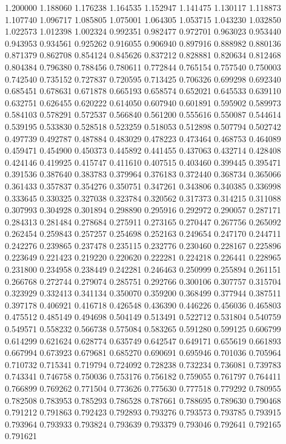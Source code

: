 1.200000
1.188060
1.176238
1.164535
1.152947
1.141475
1.130117
1.118873
1.107740
1.096717
1.085805
1.075001
1.064305
1.053715
1.043230
1.032850
1.022573
1.012398
1.002324
0.992351
0.982477
0.972701
0.963023
0.953440
0.943953
0.934561
0.925262
0.916055
0.906940
0.897916
0.888982
0.880136
0.871379
0.862708
0.854124
0.845626
0.837212
0.828881
0.820634
0.812468
0.804384
0.796380
0.788456
0.780611
0.772844
0.765154
0.757540
0.750003
0.742540
0.735152
0.727837
0.720595
0.713425
0.706326
0.699298
0.692340
0.685451
0.678631
0.671878
0.665193
0.658574
0.652021
0.645533
0.639110
0.632751
0.626455
0.620222
0.614050
0.607940
0.601891
0.595902
0.589973
0.584103
0.578291
0.572537
0.566840
0.561200
0.555616
0.550087
0.544614
0.539195
0.533830
0.528518
0.523259
0.518053
0.512898
0.507794
0.502742
0.497739
0.492787
0.487884
0.483029
0.478223
0.473464
0.468753
0.464089
0.459471
0.454900
0.450373
0.445892
0.441455
0.437063
0.432714
0.428408
0.424146
0.419925
0.415747
0.411610
0.407515
0.403460
0.399445
0.395471
0.391536
0.387640
0.383783
0.379964
0.376183
0.372440
0.368734
0.365066
0.361433
0.357837
0.354276
0.350751
0.347261
0.343806
0.340385
0.336998
0.333645
0.330325
0.327038
0.323784
0.320562
0.317373
0.314215
0.311088
0.307993
0.304928
0.301894
0.298890
0.295916
0.292972
0.290057
0.287171
0.284313
0.281484
0.278684
0.275911
0.273165
0.270447
0.267756
0.265092
0.262454
0.259843
0.257257
0.254698
0.252163
0.249654
0.247170
0.244711
0.242276
0.239865
0.237478
0.235115
0.232776
0.230460
0.228167
0.225896
0.223649
0.221423
0.219220
0.220620
0.222281
0.224218
0.226441
0.228965
0.231800
0.234958
0.238449
0.242281
0.246463
0.250999
0.255894
0.261151
0.266768
0.272744
0.279074
0.285751
0.292766
0.300106
0.307757
0.315704
0.323929
0.332413
0.341134
0.350070
0.359200
0.368499
0.377944
0.387511
0.397178
0.406921
0.416718
0.426548
0.436390
0.446226
0.456036
0.465803
0.475512
0.485149
0.494698
0.504149
0.513491
0.522712
0.531804
0.540759
0.549571
0.558232
0.566738
0.575084
0.583265
0.591280
0.599125
0.606799
0.614299
0.621624
0.628774
0.635749
0.642547
0.649171
0.655619
0.661893
0.667994
0.673923
0.679681
0.685270
0.690691
0.695946
0.701036
0.705964
0.710732
0.715341
0.719794
0.724092
0.728238
0.732234
0.736081
0.739783
0.743341
0.746758
0.750036
0.753176
0.756182
0.759055
0.761797
0.764411
0.766899
0.769262
0.771504
0.773626
0.775630
0.777518
0.779292
0.780955
0.782508
0.783953
0.785293
0.786528
0.787661
0.788695
0.789630
0.790468
0.791212
0.791863
0.792423
0.792893
0.793276
0.793573
0.793785
0.793915
0.793964
0.793933
0.793824
0.793639
0.793379
0.793046
0.792641
0.792165
0.791621
